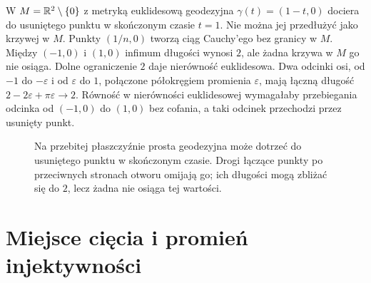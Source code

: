 \begin{przyklad}
W $M=\mathbb{R}^2\setminus\{0\}$ z metryką euklidesową
geodezyjna $\gamma(t)=(1-t,0)$ dociera do
usuniętego punktu w skończonym czasie $t=1$.
Nie można jej przedłużyć jako krzywej w $M$.
Punkty $(1/n,0)$ tworzą ciąg Cauchy'ego bez
granicy w $M$. Między $(-1,0)$ i $(1,0)$
infimum długości wynosi $2$, ale żadna krzywa
w $M$ go nie osiąga. Dolne ograniczenie $2$ daje
nierówność euklidesowa. Dwa odcinki osi, od $-1$ do
$-\varepsilon$ i od $\varepsilon$ do $1$, połączone
półokręgiem promienia $\varepsilon$, mają łączną długość
$2-2\varepsilon+\pi\varepsilon\to2$.
Równość w nierówności euklidesowej wymagałaby przebiegania
odcinka od $(-1,0)$ do $(1,0)$ bez cofania, a taki odcinek
przechodzi przez usunięty punkt.
\end{przyklad}

\begin{figure}[htbp]
\centering
{}
\caption{Na przebitej płaszczyźnie prosta geodezyjna może dotrzeć do usuniętego punktu w skończonym czasie. Drogi łączące punkty po przeciwnych stronach otworu omijają go; ich długości mogą zbliżać się do $2$, lecz żadna nie osiąga tej wartości.}
\label{fig:geodezyjna-przebita-plaszczyzna}
\end{figure}

\section{Miejsce cięcia i promień injektywności}
\label{sec:geodezyjne-miejsce-ciecia}

